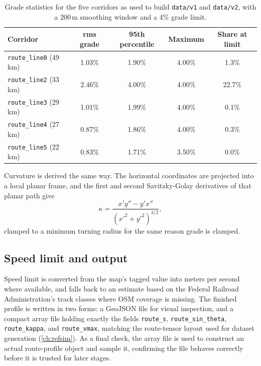 \begin{table}[htbp]
    \centering
    \begin{tabular}{lcccc}
        \toprule
        Corridor & rms grade & 95th percentile & Maximum & Share at limit \\
        \midrule
        \texttt{route\_line0} (49\,km) & 1.03\% & 1.90\% & 4.00\% & 1.3\% \\
        \texttt{route\_line2} (33\,km) & 2.46\% & 4.00\% & 4.00\% & 22.7\% \\
        \texttt{route\_line3} (29\,km) & 1.01\% & 1.99\% & 4.00\% & 0.1\% \\
        \texttt{route\_line4} (27\,km) & 0.87\% & 1.86\% & 4.00\% & 0.3\% \\
        \texttt{route\_line5} (22\,km) & 0.83\% & 1.71\% & 3.50\% & 0.0\% \\
        \bottomrule
    \end{tabular}
    \caption{Grade statistics for the five corridors as used to build \texttt{data/v1} and \texttt{data/v2}, with a 200\,m smoothing window and a 4\% grade limit.}
    \label{tab:route_grade_stats_v2}
\end{table}

Curvature is derived the same way. The horizontal coordinates are projected into a local planar frame, and the first and second Savitzky-Golay derivatives of that planar path give
\begin{equation}
    \kappa = \frac{x' y'' - y' x''}{\left(x'^2 + y'^2\right)^{3/2}},
    \label{eq:route_curvature}
\end{equation}
clamped to a minimum turning radius for the same reason grade is clamped.

\subsection{Speed limit and output}

Speed limit is converted from the map's tagged value into meters per second where available, and falls back to an estimate based on the Federal Railroad Administration's track classes \cite{fra_track_classes} where OSM coverage is missing. The finished profile is written in two forms: a GeoJSON file for visual inspection, and a compact array file holding exactly the fields \texttt{route\_s}, \texttt{route\_sin\_theta}, \texttt{route\_kappa}, and \texttt{route\_vmax}, matching the route-tensor layout used for dataset generation (\cref{ch:refsim}). As a final check, the array file is used to construct an actual route-profile object and sample it, confirming the file behaves correctly before it is trusted for later stages.

